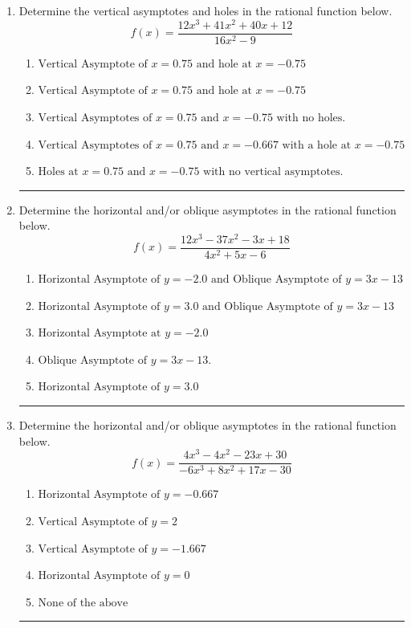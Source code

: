 \documentclass[14pt]{extbook}
\newcommand{\litem}[1]{\item#1\hspace*{-1cm}\rule{\textwidth}{0.4pt}}
\begin{document}
\begin{enumerate}
{\begin{enumerate}[label=\Alph*.]
\end{enumerate} }
\litem{
Determine the vertical asymptotes and holes in the rational function below.\[ f(x) = \frac{12x^{3} +41 x^{2} +40 x + 12}{16x^{2} -9} \]\begin{enumerate}[label=\Alph*.]
\item \( \text{Vertical Asymptote of } x = 0.75 \text{ and hole at } x = -0.75 \)
\item \( \text{Vertical Asymptote of } x = 0.75 \text{ and hole at } x = -0.75 \)
\item \( \text{Vertical Asymptotes of } x = 0.75 \text{ and } x = -0.75 \text{ with no holes.} \)
\item \( \text{Vertical Asymptotes of } x = 0.75 \text{ and } x = -0.667 \text{ with a hole at } x = -0.75 \)
\item \( \text{Holes at } x = 0.75 \text{ and } x = -0.75 \text{ with no vertical asymptotes.} \)

\end{enumerate} }
\litem{
Determine the horizontal and/or oblique asymptotes in the rational function below.\[ f(x) = \frac{12x^{3} -37 x^{2} -3 x + 18}{4x^{2} +5 x -6} \]\begin{enumerate}[label=\Alph*.]
\item \( \text{Horizontal Asymptote of } y = -2.0 \text{ and Oblique Asymptote of } y = 3x -13 \)
\item \( \text{Horizontal Asymptote of } y = 3.0 \text{ and Oblique Asymptote of } y = 3x -13 \)
\item \( \text{Horizontal Asymptote at } y = -2.0 \)
\item \( \text{Oblique Asymptote of } y = 3x -13. \)
\item \( \text{Horizontal Asymptote of } y = 3.0  \)

\end{enumerate} }
\litem{
Determine the horizontal and/or oblique asymptotes in the rational function below.\[ f(x) = \frac{4x^{3} -4 x^{2} -23 x + 30}{-6x^{3} +8 x^{2} +17 x -30} \]\begin{enumerate}[label=\Alph*.]
\item \( \text{Horizontal Asymptote of } y = -0.667  \)
\item \( \text{Vertical Asymptote of } y = 2  \)
\item \( \text{Vertical Asymptote of } y = -1.667  \)
\item \( \text{Horizontal Asymptote of } y = 0  \)
\item \( \text{None of the above} \)


\end{enumerate}}
\end{enumerate}
\end{document}
